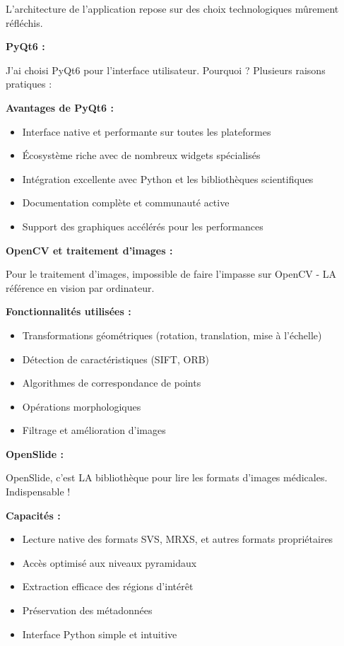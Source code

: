 \documentclass[11pt,a4paper]{report}
\begin{document}
L'architecture de l'application repose sur des choix technologiques mûrement réfléchis.

\textbf{PyQt6 :}

J'ai choisi PyQt6 pour l'interface utilisateur. Pourquoi ? Plusieurs raisons pratiques :

\textbf{Avantages de PyQt6 :}
\begin{itemize}
\item Interface native et performante sur toutes les plateformes
\item Écosystème riche avec de nombreux widgets spécialisés
\item Intégration excellente avec Python et les bibliothèques scientifiques
\item Documentation complète et communauté active
\item Support des graphiques accélérés pour les performances
\end{itemize}

\textbf{OpenCV et traitement d'images :}

Pour le traitement d'images, impossible de faire l'impasse sur OpenCV - LA référence en vision par ordinateur.

\textbf{Fonctionnalités utilisées :}
\begin{itemize}
\item Transformations géométriques (rotation, translation, mise à l'échelle)
\item Détection de caractéristiques (SIFT, ORB)
\item Algorithmes de correspondance de points
\item Opérations morphologiques
\item Filtrage et amélioration d'images
\end{itemize}

\textbf{OpenSlide :}

OpenSlide, c'est LA bibliothèque pour lire les formats d'images médicales. Indispensable !

\textbf{Capacités :}
\begin{itemize}
\item Lecture native des formats SVS, MRXS, et autres formats propriétaires
\item Accès optimisé aux niveaux pyramidaux
\item Extraction efficace des régions d'intérêt
\item Préservation des métadonnées
\item Interface Python simple et intuitive
\end{itemize}
\end{document}
